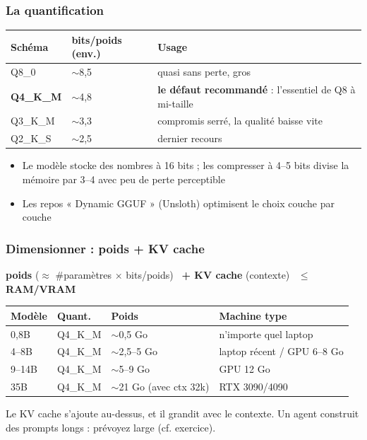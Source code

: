 \documentclass[
	11pt,
	aspectratio=169
]{beamer}
\begin{document}
\begin{frame}
    \frametitle{La quantification}
    \begin{center}
        \footnotesize
        \begin{tabular}{@{}lll@{}}
            \toprule
            \textbf{Schéma} & \textbf{bits/poids (env.)} & \textbf{Usage} \\
            \midrule
            Q8\_0   & $\sim$8,5 & quasi sans perte, gros \\
            \textbf{Q4\_K\_M} & $\sim$4,8 & \textbf{le défaut recommandé} : l'essentiel de Q8 à mi-taille \\
            Q3\_K\_M & $\sim$3,3 & compromis serré, la qualité baisse vite \\
            Q2\_K\_S & $\sim$2,5 & dernier recours \\
            \bottomrule
        \end{tabular}
    \end{center}
    \vfill
    \begin{itemize}\setlength\itemsep{0.4em}
        \item Le modèle stocke des nombres à 16 bits ; les compresser à 4--5 bits divise la mémoire par 3--4 avec peu de perte perceptible
        \item Les repos « Dynamic GGUF » (Unsloth) optimisent le choix couche par couche
    \end{itemize}
\end{frame}

\begin{frame}
    \frametitle{Dimensionner : poids + KV cache}
    \begin{center}
        {\large \textbf{poids} ($\approx$ \#paramètres $\times$ bits/poids) \ \textbf{+ KV cache} (contexte) \ $\leq$ \textbf{RAM/VRAM}}
    \end{center}
    \bigskip
    \begin{center}
        \begin{tabular}{@{}llll@{}}
            \toprule
            \textbf{Modèle} & \textbf{Quant.} & \textbf{Poids} & \textbf{Machine type} \\
            \midrule
            0{,}8B & Q4\_K\_M & $\sim$0{,}5 Go & n'importe quel laptop \\
            4--8B & Q4\_K\_M & $\sim$2{,}5--5 Go & laptop récent / GPU 6--8 Go \\
            9--14B & Q4\_K\_M & $\sim$5--9 Go & GPU 12 Go \\
            35B & Q4\_K\_M & $\sim$21 Go (avec ctx 32k) & RTX 3090/4090 \\
            \bottomrule
        \end{tabular}
    \end{center}
    \vfill
    \begin{alertblock}{}
        Le KV cache s'ajoute au-dessus, et il grandit avec le contexte. Un agent construit des prompts longs : prévoyez large (cf. exercice).
    \end{alertblock}
\end{frame}
\end{document}
